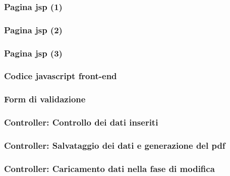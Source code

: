 \documentclass[]{beamer}
\begin{document}
    \begin{frame}
        \frametitle{Pagina jsp (1)}
        
    \end{frame}

    \begin{frame}
        \frametitle{Pagina jsp (2)}
        
    \end{frame}

    \begin{frame}
        \frametitle{Pagina jsp (3)}
        
    \end{frame}

    \begin{frame}
        \frametitle{Codice javascript front-end}
        
    \end{frame}

    \begin{frame}
        \frametitle{Form di validazione}
        
    \end{frame}

    \begin{frame}
        \frametitle{Controller: Controllo dei dati inseriti}
        
    \end{frame}

    \begin{frame}
        \frametitle{Controller: Salvataggio dei dati e generazione del pdf}
        
    \end{frame}

    \begin{frame}
        \frametitle{Controller: Caricamento dati nella fase di modifica}
        
    \end{frame}
\end{document}
